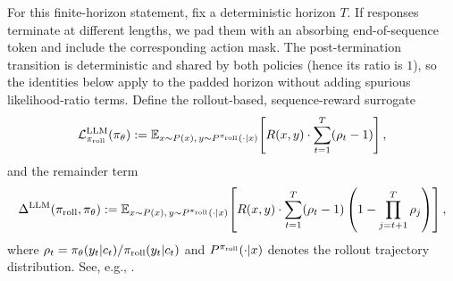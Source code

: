 \begin{definition}
\label{def:llm-surrogate}
For this finite-horizon statement, fix a deterministic horizon $T$. If responses terminate at different lengths, we pad them with an
absorbing end-of-sequence token and include the corresponding action mask. The post-termination transition is deterministic and shared
by both policies (hence its ratio is $1$), so the identities below apply to the padded horizon without adding spurious likelihood-ratio
terms.
Define the rollout-based, sequence-reward surrogate
\begin{equation*}
    \mathcal{L}_{\pi_{\mathrm{roll}}}^{\mathrm{LLM}}(\pi_{\theta})
    :=
    \mathbb{E}_{x \sim P(x),\, y \sim P^{\pi_{\mathrm{roll}}}(\cdot|x)}\!\left[
        R(x,y)\cdot \sum_{t=1}^{T}(\rho_t-1)
    \right],
\end{equation*}
and the remainder term
\begin{equation*}
    \Delta^{\mathrm{LLM}}(\pi_{\mathrm{roll}},\pi_{\theta})
    :=
    \mathbb{E}_{x \sim P(x),\, y \sim P^{\pi_{\mathrm{roll}}}(\cdot|x)}\!\left[
        R(x,y)\cdot \sum_{t=1}^{T}(\rho_t-1)\left(1-\prod_{j=t+1}^{T}\rho_j\right)
    \right],
\end{equation*}
where $\rho_t=\pi_{\theta}(y_t|c_t)/\pi_{\mathrm{roll}}(y_t|c_t)$ and $P^{\pi_{\mathrm{roll}}}(\cdot|x)$ denotes the rollout trajectory distribution.
See, e.g., \citet{qi2026rethinkingtrustregionllm}.
\end{definition}

